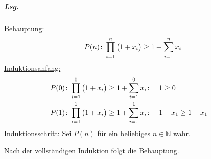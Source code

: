 \documentclass{scrreprt}
\begin{document}
\subparagraph{Lsg.}
\underline{Behauptung:}
\[
  P(n) \colon \prod_{i = 1}^n \qty\big(1 + x_i) \geq 1 + \sum_{i = 1}^n x_i
\]
\underline{Induktionsanfang:}
\begin{align*}
  P(0) &\colon \prod_{i = 1}^0 \qty\big(1 + x_i) \geq 1 + \sum_{i = 1}^0 x_i
       \colon && 1 \geq 0 && \\
  P(1) &\colon \prod_{i = 1}^1 \qty\big(1 + x_i) \geq 1 + \sum_{i = 1}^1 x_i
       \colon && 1 + x_1 \geq 1 + x_1
\end{align*}
\underline{Induktionsschritt:} Sei $P(n)$ für ein beliebiges $n \in \mathbb{N}$
wahr.

Nach der vollständigen Induktion folgt die Behauptung.
\end{document}
